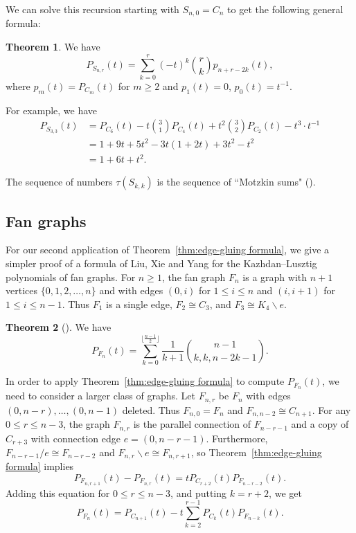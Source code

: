 \documentclass[12pt,reqno]{amsart}
\theoremstyle{definition}
\newtheorem{theorem}{Theorem}[section]
\theoremstyle{remark}
\newcommand{\ssm}{\smallsetminus}
\renewcommand{\(}{\left(}
\renewcommand{\)}{\right)}
\newcommand{\<}{\left<}
\renewcommand{\>}{\right>}
\begin{document}
We can solve this recursion starting with $S_{n,0} = C_n$ to get the following general formula:
\begin{theorem}\label{thm:KL of Snr}
We have 
\[P_{S_{n,r}}(t) = \sum_{k=0}^r (-t)^k\binom{r}{k}p_{n+r-2k}(t),\]
where $p_m(t) = P_{C_m}(t)$ for $m \ge 2$ and 
$p_1(t) = 0$, $p_0(t) = t^{-1}$.
\end{theorem}

For example, we have
\begin{align*}
P_{S_{3,3}}(t) & = P_{C_6}(t) - t\binom31 P_{C_4}(t) + t^2\binom32 P_{C_2}(t) -t^3\cdot t^{-1} \\
& = 1+9t+5t^2 - 3t(1+2t) + 3t^2 - t^2 \\
& = 1 + 6t + t^2. 
\end{align*}

The sequence of numbers $\tau(S_{k,k})$ is the sequence of ``Motzkin sums" (\cite[sequence A00504]{OEIS}).

\subsection{Fan graphs}

For our second application of Theorem~\ref{thm:edge-gluing formula}, we give a simpler proof of a formula of Liu, Xie and Yang \cite{LXY} for the Kazhdan--Lusztig polynomials of fan graphs.
For $n\ge 1$, the fan graph $F_n$ is a graph with $n+1$ vertices $\{0,1,2,\dots, n\}$ and with edges 
$(0,i)$ for $1 \le i \le n$ and $(i, i+1)$ for $1 \le i \le n-1$.  Thus $F_1$ is a single edge, $F_2 \cong C_3$, and $F_3 \cong K_4 \ssm e$. 

\begin{theorem}[\cite{LXY}]\label{thm:KL of Fn}
We have 
\begin{equation}\label{eq:fan formula}
P_{F_n}(t) = \sum_{k=0}^{\lfloor \frac{n-1}2 \rfloor} \frac{1}{k+1}\binom{n-1}{k,k,n-2k-1}.
\end{equation}
\end{theorem}

In order to apply Theorem~\ref{thm:edge-gluing formula} to compute
$P_{F_n}(t)$, we need to consider a larger class of graphs.  Let $F_{n,r}$ be $F_n$ with edges 
$(0,n-r), \dots, (0,n-1)$ deleted. Thus $F_{n,0} = F_n$ and $F_{n,n-2}\cong C_{n+1}$.
For any $0 \le r \le n-3$, the graph $F_{n,r}$ is the parallel connection of  
$F_{n-r-1}$ and a copy of $C_{r+3}$ with connection edge $e = (0,n-r-1)$.
Furthermore, $F_{n-r-1}/e \cong F_{n-r-2}$ and $F_{n,r} \ssm e \cong F_{n,r+1}$, so Theorem~\ref{thm:edge-gluing formula} implies
\[P_{F_{n,r+1}}(t) - P_{F_{n,r}}(t) = tP_{C_{r+2}}(t)P_{F_{n-r-2}}(t).\]
Adding this equation for $0\le r \le n-3$, and putting $k = r+2$, we get
\begin{equation}\label{eq:relating F and C}
P_{F_n}(t) = P_{C_{n+1}}(t) - t\sum_{k = 2}^{r-1}P_{C_k}(t)P_{F_{n-k}}(t).
\end{equation}
\end{document}
